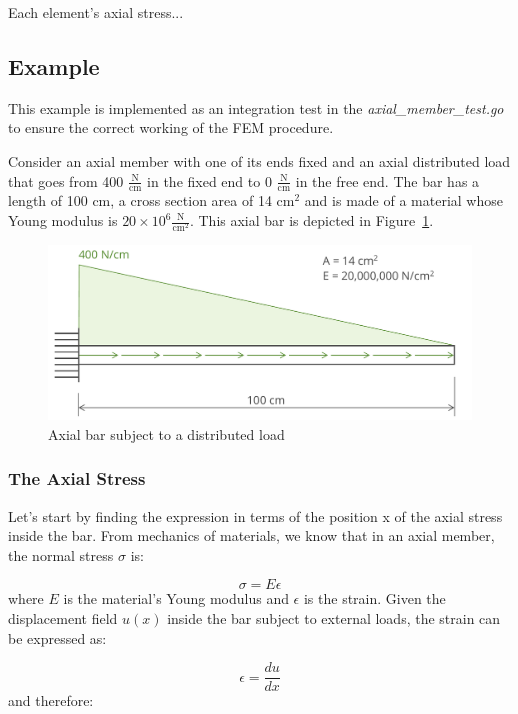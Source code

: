 Each element's axial stress...

\subsection{Example}

This example is implemented as an integration test in the \emph{axial\_member\_test.go} to ensure the correct working of the FEM procedure.

Consider an axial member with one of its ends fixed and an axial distributed load that goes from 400 $\frac{\text{N}}{\text{cm}}$ in the fixed end to 0 $\frac{\text{N}}{\text{cm}}$ in the free end.
The bar has a length of 100 cm, a cross section area of 14 $\text{cm}^2$ and is made of a material whose Young modulus is $20 \times 10^6 \frac{\text{N}}{\text{cm}^2}$.
This axial bar is depicted in Figure~\ref{fig:axial_bar_distributed}.

\begin{figure}[h]
  \label{fig:axial_bar_distributed}
  \includegraphics[width=\linewidth]{sections/img/axial_bar_distributed.pdf}
  \caption{Axial bar subject to a distributed load}
\end{figure}

\subsubsection{The Axial Stress}

Let's start by finding the expression in terms of the position x of the axial stress inside the bar.
From mechanics of materials, we know that in an axial member, the normal stress $\sigma$ is:

\[
  \sigma = E \epsilon  
\]
where $E$ is the material's Young modulus and $\epsilon$ is the strain.
Given the displacement field $u(x)$ inside the bar subject to external loads, the strain can be expressed as:

\[
  \epsilon = \frac{du}{dx}  
\]
and therefore:

